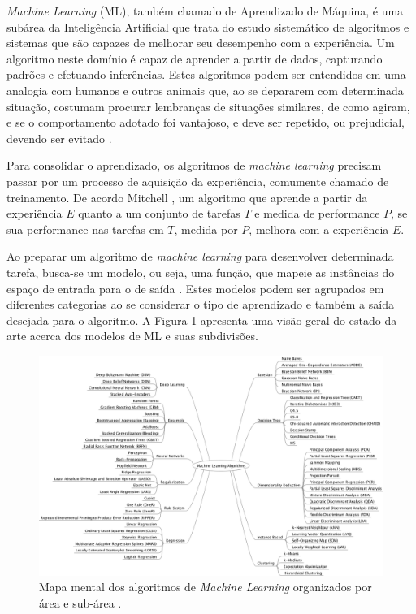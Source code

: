 
\emph{Machine Learning} (ML), também chamado de Aprendizado de Máquina, é uma subárea da Inteligência Artificial que trata do estudo sistemático de algoritmos e sistemas que são capazes de melhorar seu desempenho com a experiência. Um algoritmo neste domínio é capaz de aprender a partir de dados, capturando padrões e efetuando inferências. Estes algoritmos podem ser entendidos em uma analogia com  humanos e outros animais que, ao se depararem com determinada situação, costumam procurar lembranças de situações similares, de como agiram, e se o comportamento adotado foi vantajoso, e deve ser repetido, ou prejudicial, devendo ser evitado \cite{marsland2015machine,goodfellow2016deep,flach2012machine}.

Para consolidar o aprendizado, os algoritmos de \emph{machine learning} precisam passar por um processo de aquisição da experiência, comumente chamado de treinamento. De acordo Mitchell \cite{mitchell1997machine}, um algoritmo que aprende a partir da experiência $E$ quanto a um conjunto de tarefas $T$ e medida de performance $P$, se sua performance nas tarefas em $T$, medida por $P$, melhora com a experiência $E$.

Ao preparar um algoritmo de \emph{machine learning} para desenvolver determinada tarefa, busca-se um modelo, ou seja, uma função, que mapeie as instâncias do espaço de entrada para o de saída \cite{flach2012machine}. Estes modelos podem ser agrupados em diferentes categorias ao se considerar o tipo de aprendizado e também a saída desejada para o algoritmo. A Figura \ref{fig:ml_algorithms} apresenta uma visão geral do estado da arte acerca dos modelos de ML e suas subdivisões.

\begin{figure}
	\includegraphics[width=\linewidth]{img/machinelearningalgorithms.png}
	\caption{Mapa mental dos algoritmos de \emph{Machine Learning} organizados por área e sub-área \cite{ml:algos}.}
	\label{fig:ml_algorithms}
\end{figure}

